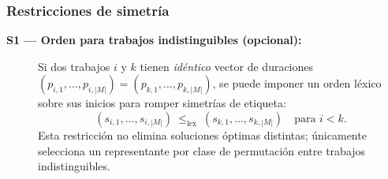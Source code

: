 \subsubsection*{Restricciones de simetría}
\begin{description}
  \item[\textbf{S1 — Orden para trabajos indistinguibles (opcional):}] Si dos trabajos \(i\) y \(k\) tienen \emph{idéntico} vector de duraciones \((p_{i,1},\dots,p_{i,|M|})=(p_{k,1},\dots,p_{k,|M|})\), se puede imponer un orden léxico sobre sus inicios para romper simetrías de etiqueta:  
  \[
  (s_{i,1},\dots,s_{i,|M|})\ \le_{\text{lex}}\ (s_{k,1},\dots,s_{k,|M|}) \quad \text{para } i<k.
  \]
  Esta restricción no elimina soluciones óptimas distintas; únicamente selecciona un representante por clase de permutación entre trabajos indistinguibles.
\end{description}

